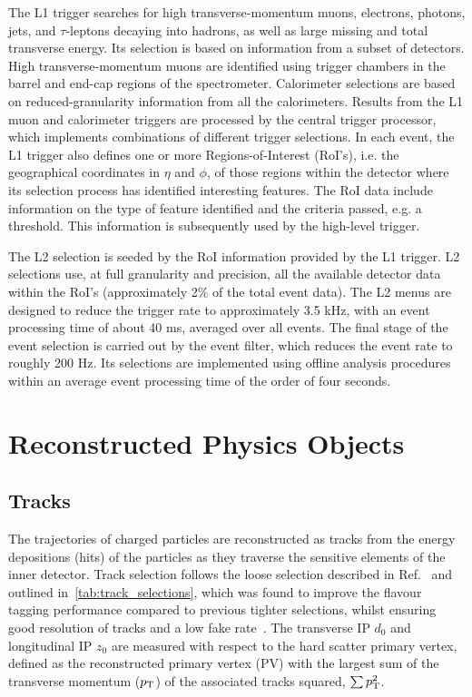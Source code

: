 The L1 trigger searches for high transverse-momentum muons, electrons, photons, jets, and $\tau$-leptons decaying into hadrons, as well as large missing and total transverse energy. Its selection is based on information from a subset of detectors. High transverse-momentum muons are identified using trigger chambers in the barrel and end-cap regions of the spectrometer. Calorimeter selections are based on reduced-granularity information from all the calorimeters. Results from the L1 muon and calorimeter triggers are processed by the central trigger processor, which implements combinations of different trigger selections. In each event, the L1 trigger also defines one or more Regions-of-Interest (RoI’s), i.e. the geographical coordinates in $\eta$ and $\phi$, of those regions within the detector where its selection process has identified interesting features. The RoI data include information on the type of feature identified and the criteria passed, e.g. a threshold. This information is subsequently used by the high-level trigger.

The L2 selection is seeded by the RoI information provided by the L1 trigger. L2 selections use, at full granularity and precision, all the available detector data within the RoI’s (approximately 2\% of the total event data). The L2 menus are designed to reduce the trigger rate to approximately 3.5 kHz, with an event processing time of about 40 ms, averaged over all events. The final stage of the event selection is carried out by the event filter, which reduces the event rate to roughly 200 Hz. Its selections are implemented using offline analysis procedures within an average event processing time of the order of four seconds.








\section{Reconstructed Physics Objects}\label{sec:physics-objects}

\subsection{Tracks}\label{sec:tracks}

The trajectories of charged particles are reconstructed as tracks from the energy depositions (hits) of the particles as they traverse the sensitive elements of the inner detector.
Track selection follows the loose selection described in Ref.~\cite{ATL-PHYS-PUB-2020-014} and outlined in~\cref{tab:track_selections}, which was found to improve the flavour tagging performance compared to previous tighter selections, whilst ensuring good resolution of tracks and a low fake rate~\cite{PERF-2015-08}.
The transverse IP $d_0$ and longitudinal IP $z_0$ are measured with respect to the hard scatter primary vertex, defined as the reconstructed primary vertex (PV) with the largest sum of the transverse momentum ($p_{\text{T}}$) of the associated tracks squared, $\sum p_{\text{T}}^2$.

